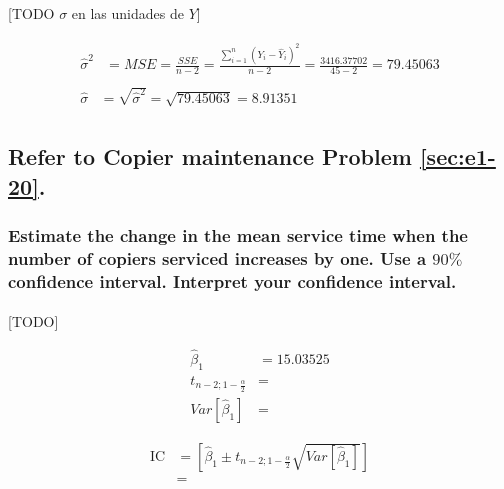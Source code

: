 \documentclass{article}
\begin{document}
        \paragraph{}
        [TODO $\sigma$ en las unidades de $Y$]

        \begin{align}
          \begin{split}
            \widehat{\sigma}^2 &= MSE = \frac{SSE}{n-2} = \frac{\sum_{i=1}^n(Y_i - \widehat{Y}_i)^2}{n-2} = \frac{3416.37702}{45-2} = 79.45063
          \end{split} \\
          \begin{split}
            \widehat{\sigma} &= \sqrt{\widehat{\sigma}^2} = \sqrt{79.45063} = 8.91351
          \end{split}
        \end{align}

    \setcounter{section}{2}
    \setcounter{subsection}{4}
    \subsection{Refer to \textbf{Copier maintenance} Problem \ref{sec:e1-20}.}

      \subsubsection{Estimate the change in the mean service time when the number of copiers serviced increases by one. Use a $90\%$ confidence interval. Interpret your confidence interval.}
      \label{sec:copiers-2.5a}

        \paragraph{}
        [TODO]

        \begin{align}
          \widehat{\beta}_1 &= 15.03525 \\
          t_{n-2;1-\frac{\alpha}{2}} &= \\
          Var\left[\widehat{\beta}_1\right] &=
        \end{align}

        \begin{align}
          \text{IC} &= \left[\widehat{\beta}_1 \pm t_{n-2;1-\frac{\alpha}{2}}\sqrt{Var\left[\widehat{\beta}_1\right]}\right]\\
          &=
        \end{align}
\end{document}

